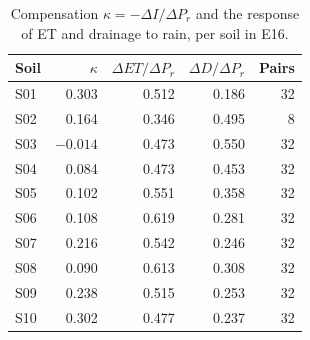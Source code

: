 \documentclass[preprint,12pt,authoryear]{elsarticle}
\begin{document}
\begin{table}[H]\centering\small
\caption{Compensation $\kappa=-\Delta I/\Delta P_r$ and the response of ET and drainage to rain, per soil in E16.}
\label{tab:kappa}
\begin{tabular}{lrrrr}
\toprule
Soil & $\kappa$ & $\Delta\mathit{ET}/\Delta P_r$ & $\Delta D/\Delta P_r$ & Pairs\\\midrule
S01 & 0.303 & 0.512 & 0.186 & 32\\
S02 & 0.164 & 0.346 & 0.495 & 8\\
S03 & $-0.014$ & 0.473 & 0.550 & 32\\
S04 & 0.084 & 0.473 & 0.453 & 32\\
S05 & 0.102 & 0.551 & 0.358 & 32\\
S06 & 0.108 & 0.619 & 0.281 & 32\\
S07 & 0.216 & 0.542 & 0.246 & 32\\
S08 & 0.090 & 0.613 & 0.308 & 32\\
S09 & 0.238 & 0.515 & 0.253 & 32\\
S10 & 0.302 & 0.477 & 0.237 & 32\\\bottomrule
\end{tabular}
\end{table}

\end{document}
